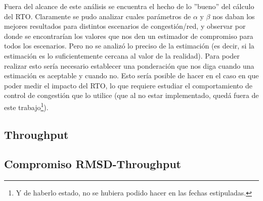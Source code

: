 \par Fuera del alcance de este an\'alisis se encuentra el hecho de lo ''bueno''
del c\'alculo del RTO. Claramente se pudo analizar cuales par\'ametros de
$\alpha$ y $\beta$ nos daban los mejores resultados para distintos escenarios de
congesti\'on/red, y observar por donde se encontrar\'ian los valores que nos den
un estimador de compromiso para todos los escenarios. Pero no se analiz\'o lo
preciso de la estimaci\'on (es decir, si la estimaci\'on es lo suficientemente
cercana al valor de la realidad). Para poder realizar esto ser\'ia necesario
establecer una ponderaci\'on que nos diga cuando una estimaci\'on es aceptable y
cuando no. Esto ser\'ia posible de hacer en el caso en que poder medir el
impacto del RTO, lo que requiere estudiar el comportamiento de control de
congesti\'on que lo utilice (que al no estar implementado, qued\'a fuera de este
trabajo\footnote{Y de haberlo estado, no se hubiera podido hacer en las fechas
estipuladas.}).

\FloatBarrier

\subsection{Throughput}\label{sec:resultados:throughput}


\subsection{Compromiso RMSD-Throughput}\label{sec:resultados:rms_vs_throughput}


